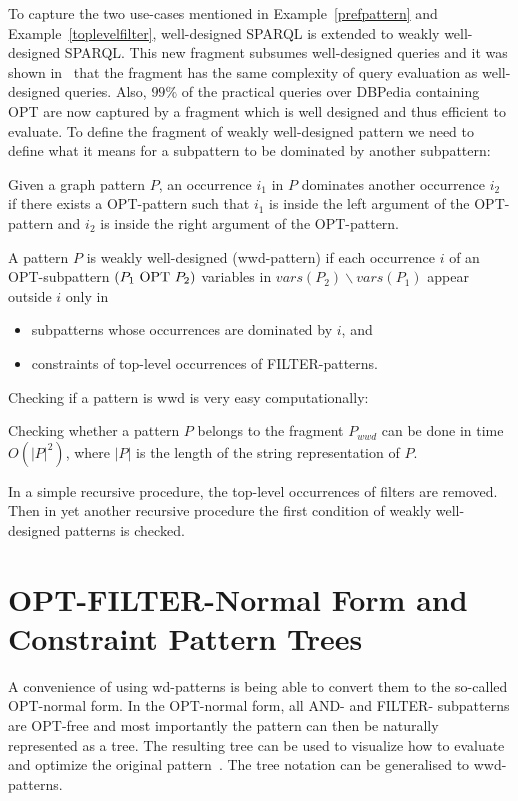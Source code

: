 To capture the two use-cases mentioned in
Example~\ref{prefpattern} and Example~\ref{toplevelfilter}, well-designed SPARQL is extended to weakly well-designed SPARQL.
This new fragment subsumes well-designed queries and it was shown in~\cite{kaminski_bwd} 
that the fragment has the same complexity 
of query evaluation as well-designed queries. 
Also, $99\%$ of the practical queries over DBPedia containing OPT are now captured by a 
fragment which is well designed and thus efficient to evaluate.
To define the fragment of weakly well-designed pattern we need to define what it
means for a subpattern to be dominated by another subpattern:
\begin{definition}
	Given a graph pattern $P$, an occurrence $i_1$ in $P$ dominates another
	occurrence $i_2$ if there exists a OPT-pattern such
	that $i_1$ is inside the left argument of the OPT-pattern and $i_2$ is
	inside the right argument of the OPT-pattern.
\end{definition}

\begin{definition}
	A pattern $P$ is weakly well-designed (wwd-pattern) if each occurrence $i$
	of an OPT-subpattern $(P_1\mbox{ OPT } P_2)$ variables in $vars(P_2) \backslash
	vars(P_1)$ appear outside $i$ only in
	\begin{itemize}
		\item subpatterns whose occurrences are dominated by $i$, and
		\item constraints of top-level occurrences of FILTER-patterns.
	\end{itemize}
\end{definition}
Checking if a pattern is wwd is very easy computationally:
\begin{proposition}
	Checking whether a pattern $P$ belongs to the fragment $P_{wwd}$ can be done
	in time $O(|P|^2)$, where $|P|$ is the length of the string representation
	of $P$.
\end{proposition}
\begin{proofidea}
	In a simple recursive procedure, the top-level occurrences of filters are
	removed.  Then in yet another recursive procedure  the first condition of
	weakly well-designed patterns is checked. 
\end{proofidea}

\section{OPT-FILTER-Normal Form and Constraint Pattern Trees}
A convenience of using wd-patterns is being able to convert them to the so-called
OPT-normal form. In the OPT-normal form, all AND- and FILTER- subpatterns are
OPT-free and most importantly the pattern can then be naturally represented as a
tree. The resulting tree can be used to visualize how to evaluate and optimize
the original pattern~\cite{letelier2013static, pichler2014containment}. The tree
notation can be generalised to wwd-patterns.

